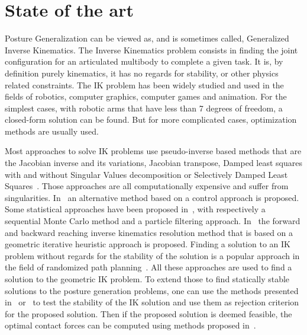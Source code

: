 
\chapter{State of the art}
\label{cha:state_of_the_art}

Posture Generalization can be viewed as, and is sometimes called, Generalized Inverse Kinematics.
The Inverse Kinematics problem consists in finding the joint configuration for an articulated multibody to complete a given task.
It is, by definition purely kinematics, it has no regards for stability, or other physics related constraints.
The IK problem has been widely studied and used in the fields of robotics, computer graphics, computer games and animation.
For the simplest cases, with robotic arms that have less than 7 degrees of freedom, a closed-form solution can be found.
But for more complicated cases, optimization methods are usually used.

Most approaches to solve IK problems use pseudo-inverse based methods that are the Jacobian inverse and its variations, Jacobian transpose, Damped least squares with and without Singular Values decomposition or Selectively Damped Least Squares~\cite{balestrino1984robust, tolani2000real, baillieul1985kinematic, wampler1986manipulator, nakamura1986inverse, buss2005selectively}.
Those approaches are all computationally expensive and suffer from singularities.
In~\cite{pechev2008inverse} an alternative method based on a control approach is proposed.
Some statistical approaches have been proposed in~\cite{courty2008inverse, hecker2008real}, with respectively a sequential Monte Carlo method and a particle filtering approach.
In~\cite{AristidouFABRIK, Aristidou:2016_ExtFABRIK} the forward and backward reaching inverse kinematics resolution method that is based on a geometric iterative heuristic approach is proposed.
Finding a solution to an IK problem without regards for the stability of the solution is a popular approach in the field of randomized path planning~\cite{cortes2002random, lavalle1999probabilistic}.
All these approaches are used to find a solution to the geometric IK problem.
To extend those to find statically stable solutions to the posture generation problems, one can use the methods presented in~\cite{bretl:itro:2008} or~\cite{rimon2008general} to test the stability of the IK solution and use them as rejection criterion for the proposed solution.
Then if the proposed solution is deemed feasible, the optimal contact forces can be computed using methods proposed in~\cite{boyd2007fast}.


